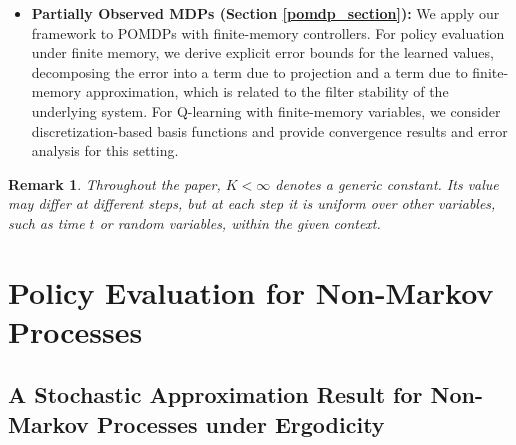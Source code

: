 \documentclass[11pt]{article}
\newtheorem{remark}{Remark}
\newtheorem{lemma}{Lemma}
\begin{document}
\begin{itemize}
\item \textbf{Partially Observed MDPs (Section \ref{pomdp_section}):} We apply our framework to POMDPs with finite-memory controllers. For policy evaluation under finite memory, we derive explicit error bounds for the learned values, decomposing the error into a term due to projection and a term due to finite-memory approximation, which is related to the filter stability of the underlying system. For Q-learning with finite-memory variables, we consider discretization-based basis functions and provide convergence results and  error analysis for this setting.
\end{itemize}



\begin{remark}
Throughout the paper, $K < \infty$ denotes a generic constant. Its value may differ at different steps, but at each step it is uniform over other variables, such as time $t$ or random variables, within the given context.
\end{remark}




\section{Policy Evaluation for Non-Markov Processes}\label{pol_eval_sec}



\subsection{A Stochastic Approximation Result for Non-Markov Processes under Ergodicity}\label{stoc_app_sec}
\end{document}
